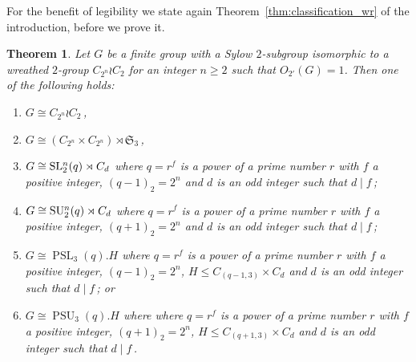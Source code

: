 \documentclass[12pt,a4paper]{amsart}
\theoremstyle{plain}\newtheorem{Theorem}{Theorem}[section]
\theoremstyle{plain}\newtheorem{Conjecture}[Theorem]{Conjecture}
\theoremstyle{plain}\newtheorem{Corollary}[Theorem]{Corollary}
\theoremstyle{plain}\newtheorem{Lemma}[Theorem]{Lemma}
\theoremstyle{plain}\newtheorem{Proposition}[Theorem]{Proposition}
\theoremstyle{definition}\newtheorem{Definition}[Theorem]{Definition}
\theoremstyle{definition}\newtheorem{Example}[Theorem]{Example}
\theoremstyle{definition}\newtheorem{Examples}[Theorem]{Examples}
\theoremstyle{definition}\newtheorem{Remark}[Theorem]{Remark}
\theoremstyle{definition}\newtheorem{Question}[Theorem]{Question}
\theoremstyle{definition}\newtheorem{Notation}[Theorem]{Notation}
\theoremstyle{definition}\newtheorem{Hypothesis}[Theorem]{Hypothesis}
\theoremstyle{definition}\newtheorem{Assumption}[Theorem]{Assumption}
\theoremstyle{definition}\newtheorem{Strategy}[Theorem]{Strategy}
\theoremstyle{definition}\newtheorem{Contents}[Theorem]{Contents}
\theoremstyle{definition}\newtheorem{Computations}[Theorem]{Computations}
\theoremstyle{definition}\newtheorem{Equivalences}[Theorem]{Equivalences}
\theoremstyle{definition}\newtheorem{Notation/Definition}[Theorem]{Notation/Definition}
\theoremstyle{definition}\newtheorem{noth}[Theorem]{}
\theoremstyle{plain}\newtheorem{Step}[Theorem]{Step}
\newcommand{\PSL}{\operatorname{PSL}}
\newcommand{\PSU}{\operatorname{PSU}}
\begin{document}
For the benefit of legibility we state again Theorem~\ref{thm:classification_wr} 
of the introduction, before we prove it.

\begin{Theorem}\label{thm:classification_wr_bis} 
Let $G$ be a finite group with a Sylow $2$-subgroup
isomorphic to a wreathed $2$-group $C_{2^n}\wr C_2$ for an integer $n\geq 2$ 
such that $O_{2'}(G) = 1$. 
Then one of the following \smallskip holds: 
\begin{enumerate}[leftmargin=17mm]
\item[{\rm\sf(WR1)}] $G\cong
C_{2^n}\wr C_2$\,,
\item[{\rm\sf (WR2)}] $G
\cong (C_{2^n}\times C_{2^n})\rtimes \mathfrak S_3$\,,
\item[{\rm\sf(WR3)}]
$G\cong{\mathrm{SL}}{\color{black}^n_2}(q) \rtimes C_d$
where $q=r^{f}$ is a power of a prime number  $r$ with $f$ a positive integer, $(q-1)_2=2^n$ and $d$ is an odd integer such that  $d\mid f$\,;
\item[{\rm\sf(WR4)}]
$G\cong{\mathrm{SU}}{\color{black}^n_2}(q) \rtimes C_d$ where $q=r^{f}$ is a power of a prime number  $r$ with $f$ a positive integer,  $(q+1)_2=2^n$ and $d$ is an odd integer such that  $d\mid f$\,;
\item[{\rm\sf(WR5)}] $G\cong\PSL_3 (q).H$ where $q=r^{f}$ is a power of a prime number  $r$ with $f$ a positive integer,  $(q-1)_2=2^n$, 
$H \leq C_{(q-1, 3)}\times C_d$ and $d$ is an odd integer such that $d\mid f$\,; or
\item[{\rm\sf(WR6)}]
$G\cong\PSU_3(q).H$ where where $q=r^{f}$ is a power of a prime number  $r$ with $f$ a positive integer,  $(q+1)_2=2^n$, $H \leq
C_{(q+1, 3)}\times C_d$  and $d$ is an odd integer such that $d\mid f$\,.
\end{enumerate}
\end{Theorem}
%
\end{document}
